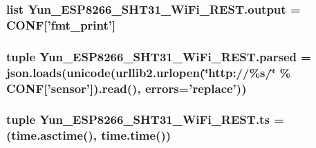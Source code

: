 \hypertarget{namespaceYun__ESP8266__SHT31__WiFi__REST_acb18c36bfe11f9d6ae35ec9914ff386f}{
\subsubsection[{output}]{\setlength{\rightskip}{0pt plus 5cm}list Yun\-\_\-\-E\-S\-P8266\-\_\-\-S\-H\-T31\-\_\-\-Wi\-Fi\-\_\-\-R\-E\-S\-T.\-output = {\bf C\-O\-N\-F}\mbox{[}'fmt\-\_\-print'\mbox{]}}}\label{namespaceYun__ESP8266__SHT31__WiFi__REST_acb18c36bfe11f9d6ae35ec9914ff386f}
\hypertarget{namespaceYun__ESP8266__SHT31__WiFi__REST_a46b22ae14dfeb87a7f7a7d7a2bbe79ab}{
\subsubsection[{parsed}]{\setlength{\rightskip}{0pt plus 5cm}tuple Yun\-\_\-\-E\-S\-P8266\-\_\-\-S\-H\-T31\-\_\-\-Wi\-Fi\-\_\-\-R\-E\-S\-T.\-parsed = json.\-loads(unicode(urllib2.\-urlopen(\char`\"{}http\-://\%s/\char`\"{} \% C\-O\-N\-F\mbox{[}'{\bf sensor}'\mbox{]}).read(), errors='replace'))}}\label{namespaceYun__ESP8266__SHT31__WiFi__REST_a46b22ae14dfeb87a7f7a7d7a2bbe79ab}
\hypertarget{namespaceYun__ESP8266__SHT31__WiFi__REST_a7770630e75551836c5d8dc48c3321a6a}{
\subsubsection[{ts}]{\setlength{\rightskip}{0pt plus 5cm}tuple Yun\-\_\-\-E\-S\-P8266\-\_\-\-S\-H\-T31\-\_\-\-Wi\-Fi\-\_\-\-R\-E\-S\-T.\-ts = (time.\-asctime(), time.\-time())}}\label{namespaceYun__ESP8266__SHT31__WiFi__REST_a7770630e75551836c5d8dc48c3321a6a}

